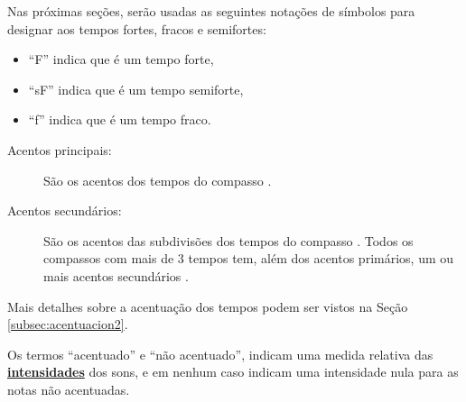 \begin{notation}
Nas próximas seções,
serão usadas as seguintes notações de símbolos para designar aos tempos fortes, fracos e semifortes:
\begin{itemize}
\item ``F''  indica que é um tempo forte, 
\item ``sF'' indica que é um tempo semiforte, 
\item ``f''  indica que é um tempo fraco.
\end{itemize}
\end{notation}

\begin{description}
\item[Acentos principais:] \label{def:acentoprincipal} 
São os acentos dos tempos do compasso \cite[pp. 142]{medteoria}.
\item[Acentos secundários:] \label{def:acentosecundario} 
São os acentos das subdivisões dos tempos do compasso \cite[pp. 142]{medteoria}.
Todos os compassos com mais de 3 tempos tem, além dos acentos primários, um ou mais acentos secundários \cite[pp. 25]{crowther2003usted}.
\begin{comment}
\begin{itemize}
\item Nos compassos com formula do compasso com numerador 6 acharemos um acento secundário na quarta subdivisão ou pulso do compasso, 
neles cada tempo tem 3 subdivisões.
\item Nos compassos com formula do compasso com numerador 9 acharemos acentos secundários na quarta e sétima subdivisão do compasso.
\end{itemize} 
\end{comment}
\end{description}
Mais detalhes sobre a acentuação dos tempos podem ser vistos na Seção \ref{subsec:acentuacion2}.

\begin{tcbattention}
Os termos ``acentuado'' e ``não acentuado'', 
indicam uma medida relativa das \hyperref[sec:pos:Intensidade]{\textbf{intensidades}} dos sons, 
e em nenhum caso indicam uma intensidade nula para as notas não acentuadas. 
\end{tcbattention}


